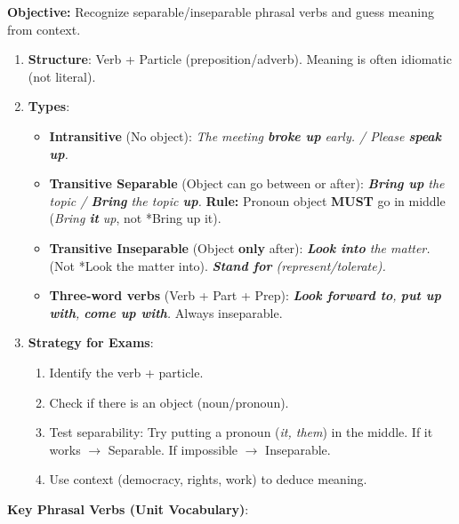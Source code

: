 \documentclass[11pt]{article}
\newcommand{\cle}[1]{{\popxbold\color{popdark}#1}}
\begin{document}
\begin{methode}
    \textbf{Objective:} Recognize separable/inseparable phrasal verbs and guess meaning from context.
    \begin{enumerate}
        \item \textbf{Structure}: Verb + Particle (preposition/adverb). Meaning is often \cle{idiomatic} (not literal).
        \item \textbf{Types}:
              \begin{itemize}
                  \item \textbf{Intransitive} (No object): \textit{The meeting \textbf{broke up} early. / Please \textbf{speak up}.}
                  \item \textbf{Transitive Separable} (Object can go between or after): \textit{\textbf{Bring up} the topic / \textbf{Bring} the topic \textbf{up}.} \textbf{Rule:} Pronoun object \textbf{MUST} go in middle (\textit{Bring \textbf{it} up}, not *Bring up it).
                  \item \textbf{Transitive Inseparable} (Object \textbf{only} after): \textit{\textbf{Look into} the matter.} (Not *Look the matter into). \textit{\textbf{Stand for} (represent/tolerate).}
                  \item \textbf{Three-word verbs} (Verb + Part + Prep): \textit{\textbf{Look forward to}, \textbf{put up with}, \textbf{come up with}.} Always inseparable.
              \end{itemize}
        \item \textbf{Strategy for Exams}:
              \begin{enumerate}
                  \item Identify the verb + particle.
                  \item Check if there is an object (noun/pronoun).
                  \item Test separability: Try putting a pronoun (\emph{it, them}) in the middle. If it works $\to$ Separable. If impossible $\to$ Inseparable.
                  \item Use context (democracy, rights, work) to deduce meaning.
              \end{enumerate}
    \end{enumerate}
    \textbf{Key Phrasal Verbs (Unit Vocabulary)}:

\end{methode}
\end{document}
